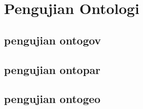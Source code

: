 \section{Pengujian Ontologi}
\subsection{pengujian ontogov}

\subsection{pengujian ontopar}
\subsection{pengujian ontogeo}